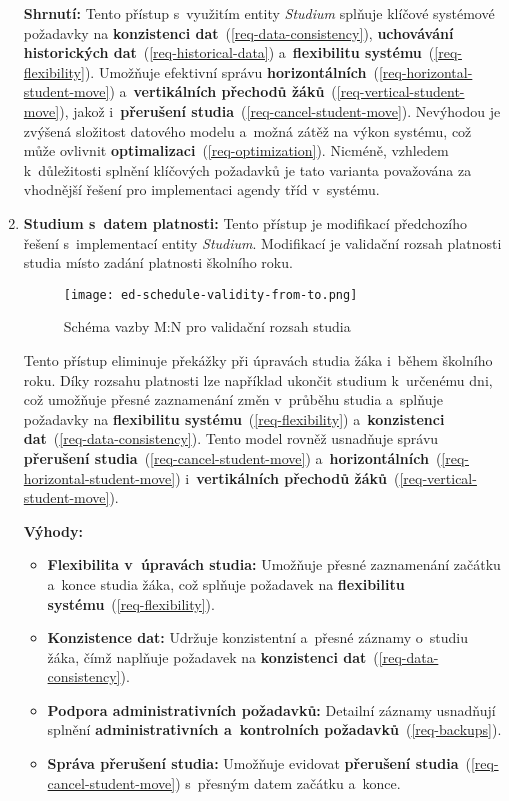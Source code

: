 \begin{enumerate}
    \textbf{Shrnutí:}
    Tento přístup s~využitím entity \textit{Studium} splňuje klíčové systémové požadavky na \textbf{konzistenci dat}~(\ref{req-data-consistency}), \textbf{uchovávání historických dat}~(\ref{req-historical-data}) a~\textbf{flexibilitu systému}~(\ref{req-flexibility}). Umožňuje efektivní správu \textbf{horizontálních}~(\ref{req-horizontal-student-move}) a~\textbf{vertikálních přechodů žáků}~(\ref{req-vertical-student-move}), jakož i~\textbf{přerušení studia}~(\ref{req-cancel-student-move}). Nevýhodou je zvýšená složitost datového modelu a~možná zátěž na výkon systému, což může ovlivnit \textbf{optimalizaci}~(\ref{req-optimization}). Nicméně, vzhledem k~důležitosti splnění klíčových požadavků je tato varianta považována za vhodnější řešení pro implementaci agendy tříd v~systému.

    \item \textbf{Studium s~datem platnosti:}
    \label{item:class-implementation-from-to-validity} Tento přístup je modifikací předchozího řešení s~implementací entity \textit{Studium}. Modifikací je validační rozsah platnosti studia místo zadání platnosti školního roku.

    \begin{figure}[H]
        \centering
        \texttt{[image: ed-schedule-validity-from-to.png]}
        \caption{Schéma vazby M:N pro validační rozsah studia}
        \label{fig:ed-schedule-validity-from-to}
    \end{figure}

    Tento přístup eliminuje překážky při úpravách studia žáka i~během školního roku. Díky rozsahu platnosti lze například ukončit studium k~určenému dni, což umožňuje přesné zaznamenání změn v~průběhu studia a~splňuje požadavky na \textbf{flexibilitu systému}~(\ref{req-flexibility}) a~\textbf{konzistenci dat}~(\ref{req-data-consistency}). Tento model rovněž usnadňuje správu \textbf{přerušení studia}~(\ref{req-cancel-student-move}) a~\textbf{horizontálních}~(\ref{req-horizontal-student-move}) i~\textbf{vertikálních přechodů žáků}~(\ref{req-vertical-student-move}).

    \textbf{Výhody:}

    \begin{itemize}
        \item \textbf{Flexibilita v~úpravách studia:} Umožňuje přesné zaznamenání začátku a~konce studia žáka, což splňuje požadavek na \textbf{flexibilitu systému}~(\ref{req-flexibility}).
        \item \textbf{Konzistence dat:} Udržuje konzistentní a~přesné záznamy o~studiu žáka, čímž naplňuje požadavek na \textbf{konzistenci dat}~(\ref{req-data-consistency}).
        \item \textbf{Podpora administrativních požadavků:} Detailní záznamy usnadňují splnění \textbf{administrativních a~kontrolních požadavků}~(\ref{req-backups}).
        \item \textbf{Správa přerušení studia:} Umožňuje evidovat \textbf{přerušení studia}~(\ref{req-cancel-student-move}) s~přesným datem začátku a~konce.
    \end{itemize}


\end{enumerate}

